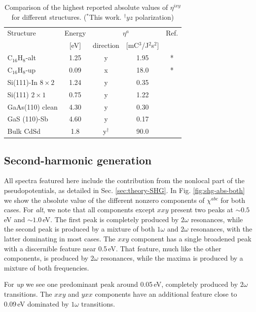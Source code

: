 \documentclass[pss]{wiley2sp} %
\begin{document}
\begin{table}%
  \sidecaption
  \begin{tabular}{lcccc}
  \hline
    Structure & Energy &  \multicolumn{2}{c}{$\eta^{a}$} &  Ref.\\
    \cline{3-4}
              & [eV]   & direction & [mC$^{3}$/J$^{2}$s$^{2}$] \\
    \hline
    C$_{16}$H$_{8}$-alt     & 1.25  & y & 1.95  & *     \\
    C$_{16}$H$_{8}$-up      & 0.09  & x & 18.0  & *     \\
    Si(111)-In $8\times2$   & 1.24  & y & 0.35  & \cite{arzate2014optical}  \\
    Si(111) $2\times1$      & 0.75  & y & 1.22  & \cite{mendoza2012optical} \\
    GaAs(110) clean         & 4.30  & y & 0.30  & \cite{nastos2007full}     \\
    GaS (110)-Sb            & 4.60  & y & 0.17  & \cite{cabellos2011optical}\\
    Bulk CdSd               & 1.8   & y$^{\dag}$ & 90.0  & \cite{nastos2006optical}  \\
  \hline
  \end{tabular}
  \caption[]{%
  Comparison of the highest reported absolute values of {$\eta^{ixy}$} for 
    different structures. ($^{*}$This work. $^{\dag}yz$ polarization)}
  \label{tab:etacomp}
\end{table}

\subsection{Second-harmonic generation}
All spectra featured here include the contribution from the nonlocal part of
the pseudopotentials, as detailed in Sec. \ref{sec:theory-SHG}. In Fig.
\ref{fig:shg-abs-both} we show the absolute value of the different nonzero
components of $\chi^{abc}$ for both cases. For \emph{alt}, we note that all
components except $xxy$ present two peaks at $\sim0.5$\,eV and $\sim1.0$\,eV.
The first peak is completely produced by $2\omega$ resonances, while the
second peak is produced by a mixture of both $1\omega$ and $2\omega$
resonances, with the latter dominating in most cases. The $xxy$ component has
a single broadened peak with a discernible feature near 0.5\,eV. That feature,
much like the other components, is produced by $2\omega$ resonances, while the
maxima is produced by a mixture of both frequencies.

For \emph{up} we see one predominant peak around 0.05\,eV, completely produced
by $2\omega$ transitions. The $xxy$ and $yxx$ components have an additional
feature close to 0.09\,eV dominated by $1\omega$ transitions.
\end{document}
